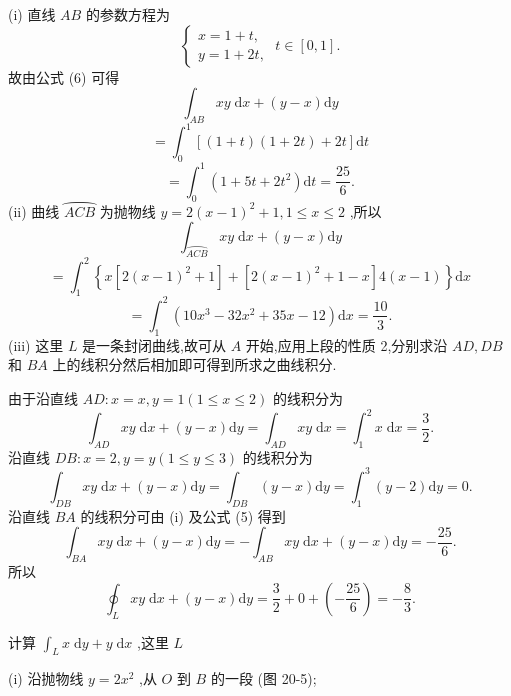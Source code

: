 \begin{solution}

\end{solution}
(i) 直线 \({AB}\) 的参数方程为
\[
\left\{  {\begin{array}{l} x = 1 + t, \\  y = 1 + {2t}, \end{array}\;t \in  \left\lbrack  {0,1}\right\rbrack  .}\right.
\]
故由公式 (6) 可得
\[
{\int }_{AB}{xy}\mathrm{\;d}x + \left( {y - x}\right) \mathrm{d}y
\]
\[
= {\int }_{0}^{1}\left\lbrack  {\left( {1 + t}\right) \left( {1 + {2t}}\right)  + {2t}}\right\rbrack  \mathrm{d}t
\]
\[
= {\int }_{0}^{1}\left( {1 + {5t} + 2{t}^{2}}\right) \mathrm{d}t = \frac{25}{6}.
\]
(ii) 曲线 \(\overset{⏜}{ACB}\) 为抛物线 \(y = 2{\left( x - 1\right) }^{2} + 1,1 \leq  x \leq  2\) ,所以
\[
{\int }_{\overset{⏜}{ACB}}{xy}\mathrm{\;d}x + \left( {y - x}\right) \mathrm{d}y
\]
\[
= {\int }_{1}^{2}\left\{  {x\left\lbrack  {2{\left( x - 1\right) }^{2} + 1}\right\rbrack   + \left\lbrack  {2{\left( x - 1\right) }^{2} + 1 - x}\right\rbrack  4\left( {x - 1}\right) }\right\}  \mathrm{d}x
\]
\[
= {\int }_{1}^{2}\left( {{10}{x}^{3} - {32}{x}^{2} + {35x} - {12}}\right) \mathrm{d}x = \frac{10}{3}.
\]
(iii) 这里 \(L\) 是一条封闭曲线,故可从 \(A\) 开始,应用上段的性质 2,分别求沿 \({AD},{DB}\) 和 \({BA}\) 上的线积分然后相加即可得到所求之曲线积分.

由于沿直线 \({AD} : x = x,y = 1\left( {1 \leq  x \leq  2}\right)\) 的线积分为
\[
{\int }_{AD}{xy}\mathrm{\;d}x + \left( {y - x}\right) \mathrm{d}y = {\int }_{AD}{xy}\mathrm{\;d}x = {\int }_{1}^{2}x\mathrm{\;d}x = \frac{3}{2}.
\]
沿直线 \({DB} : x = 2,y = y\left( {1 \leq  y \leq  3}\right)\) 的线积分为
\[
{\int }_{DB}{xy}\mathrm{\;d}x + \left( {y - x}\right) \mathrm{d}y = {\int }_{DB}\left( {y - x}\right) \mathrm{d}y = {\int }_{1}^{3}\left( {y - 2}\right) \mathrm{d}y = 0.
\]
沿直线 \({BA}\) 的线积分可由 (i) 及公式 (5) 得到
\[
{\int }_{BA}{xy}\mathrm{\;d}x + \left( {y - x}\right) \mathrm{d}y =  - {\int }_{AB}{xy}\mathrm{\;d}x + \left( {y - x}\right) \mathrm{d}y =  - \frac{25}{6}.
\]
所以
\[
{\oint }_{L}{xy}\mathrm{\;d}x + \left( {y - x}\right) \mathrm{d}y = \frac{3}{2} + 0 + \left( {-\frac{25}{6}}\right)  =  - \frac{8}{3}.
\]
\begin{example}

\end{example}
计算 \({\int }_{L}x\mathrm{\;d}y + y\mathrm{\;d}x\) ,这里 \(L\)

(i) 沿抛物线 \(y = 2{x}^{2}\) ,从 \(O\) 到 \(B\) 的一段 (图 20-5);

